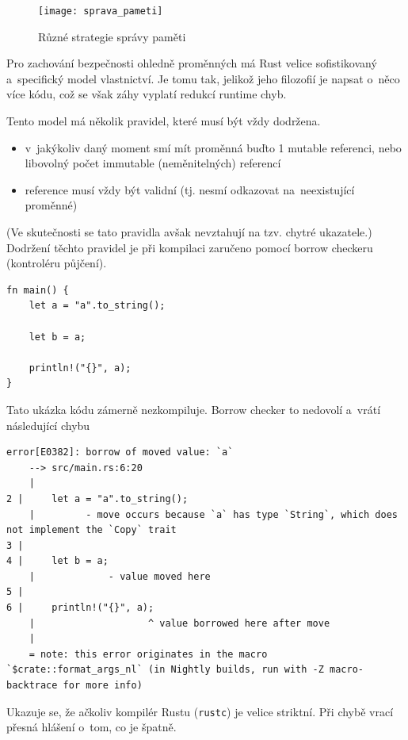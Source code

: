 \documentclass[a4paper, 12pt, twoside]{article} %
\begin{document}
			\begin{center}
				\begin{figure}[H]
					\centering
					\texttt{[image: sprava\_pameti]}
					\caption{Různé strategie správy paměti \cite{sprava_pameti}}
					\label{fig:ret_mod}
				\end{figure}
			\end{center}
		
			Pro zachování bezpečnosti ohledně proměnných má Rust velice sofistikovaný a~specifický model vlastnictví. Je tomu tak, jelikož jeho filozofií je napsat o~něco více kódu, což se však záhy vyplatí redukcí runtime chyb.
	
			Tento model má několik pravidel, které musí být vždy dodržena.
			\begin{itemize}
				\item v~jakýkoliv daný moment smí mít proměnná buďto 1 mutable referenci, nebo libovolný počet immutable (neměnitelných) referencí
				\item reference musí vždy být validní (tj. nesmí odkazovat na~neexistující proměnné)
			\end{itemize}
			
			(Ve skutečnosti se tato pravidla avšak nevztahují na tzv. chytré ukazatele.) Dodržení těchto pravidel je při kompilaci zaručeno pomocí borrow checkeru (kontroléru půjčení).
			\begin{verbatim}
fn main() {
	let a = "a".to_string();
	
	let b = a;
	
	println!("{}", a);
}
			\end{verbatim}
	
			Tato ukázka kódu zámerně nezkompiluje. Borrow checker to nedovolí a~vrátí následující chybu
			\begin{verbatim}
error[E0382]: borrow of moved value: `a`
	--> src/main.rs:6:20
	|
2 |     let a = "a".to_string();
	|         - move occurs because `a` has type `String`, which does not implement the `Copy` trait
3 |     
4 |     let b = a;
	|             - value moved here
5 |     
6 |     println!("{}", a);
	|                    ^ value borrowed here after move
	|
	= note: this error originates in the macro `$crate::format_args_nl` (in Nightly builds, run with -Z macro-backtrace for more info)

				\end{verbatim}
					
				Ukazuje se, že ačkoliv kompilér Rustu (\texttt{rustc}) je velice striktní. Při chybě vrací přesná hlášení o~tom, co je špatně.
\end{document}
